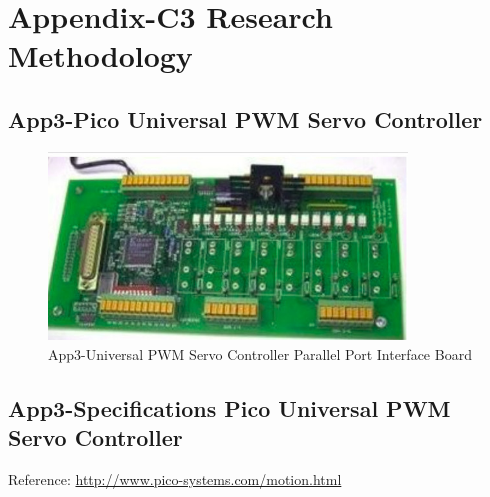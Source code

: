 \clearpage
\pagebreak
\justifying
\renewcommand{\thesection}{C \arabic{section}}

\titleformat{\section}{\normalfont\LARGE\bfseries\color{black}}{\thesection}{10pt}{\LARGE}
\section{Appendix-C3 Research Methodology}\label{sec:App3-Research-Methodology}

\subsection{App3-Pico Universal PWM Servo Controller}\label{sec:C-3.1-Universal PWM Servo Controller Board}
				
\begin{figure}[htbp]
	\begin{center}
		\includegraphics[width=0.85\textwidth]{./07-images/img-Ch3App/Universal-PWM-Servo-Controller.jpg}
		\caption{App3-Universal PWM Servo Controller Parallel Port Interface Board}
		\label{fig:App3-Universal-PWM-Servo-Controller.jpg}
	\end{center}
\end{figure}

\subsection{App3-Specifications Pico Universal PWM Servo Controller}

Reference: \url{http://www.pico-systems.com/motion.html}
\vspace{0.5cm}

